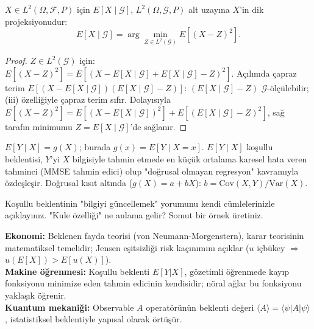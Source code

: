 \begin{onerme}
\label{prop:l2_projeksiyon}
$X \in L^2(\Omega, \mathcal{F}, P)$ için $E[X \mid \mathcal{G}]$,
$L^2(\Omega, \mathcal{G}, P)$ alt uzayına $X$'in dik projeksiyonudur:
\[
  E[X \mid \mathcal{G}] = \arg\min_{Z \in L^2(\mathcal{G})} E[(X - Z)^2].
\]
\end{onerme}

\begin{proof}
$Z \in L^2(\mathcal{G})$ için:
$E[(X-Z)^2] = E[(X - E[X\mid\mathcal{G}] + E[X\mid\mathcal{G}] - Z)^2]$.
Açılımda çapraz terim $E[(X - E[X\mid\mathcal{G}])(E[X\mid\mathcal{G}] - Z)]$:
$(E[X\mid\mathcal{G}] - Z)$ $\mathcal{G}$-ölçülebilir; (iii) özelliğiyle çapraz terim sıfır.
Dolayısıyla $E[(X-Z)^2] = E[(X-E[X\mid\mathcal{G}])^2] + E[(E[X\mid\mathcal{G}]-Z)^2]$,
sağ tarafın minimumu $Z = E[X \mid \mathcal{G}]$'de sağlanır.
\end{proof}

\begin{ornek}[Regresyon]
$E[Y \mid X] = g(X)$; burada $g(x) = E[Y \mid X = x]$.
$E[Y \mid X]$ koşullu beklentisi, $Y$'yi $X$ bilgisiyle tahmin etmede
en küçük ortalama karesel hata veren tahminci (MMSE tahmin edici) olup
"doğrusal olmayan regresyon" kavramıyla özdeşleşir.
Doğrusal kısıt altında ($g(X) = a + bX$): $b = \mathrm{Cov}(X,Y)/\mathrm{Var}(X)$.
\end{ornek}

\begin{kendinleifade}
Koşullu beklentinin "bilgiyi güncellemek" yorumunu kendi cümlelerinizle açıklayınız.
"Kule özelliği" ne anlama gelir? Somut bir örnek üretiniz.
\end{kendinleifade}

\begin{kopru}
\textbf{Ekonomi:} Beklenen fayda teorisi (von Neumann-Morgenstern), karar teorisinin
matematiksel temelidir; Jensen eşitsizliği risk kaçınımını açıklar ($u$ içbükey $\Rightarrow$ $u(E[X]) > E[u(X)]$).\\
\textbf{Makine öğrenmesi:} Koşullu beklenti $E[Y|X]$, gözetimli öğrenmede kayıp fonksiyonu
minimize eden tahmin edicinin kendisidir; nöral ağlar bu fonksiyonu yaklaşık öğrenir.\\
\textbf{Kuantum mekaniği:} Observable $A$ operatörünün beklenti değeri $\langle A \rangle = \langle \psi | A | \psi \rangle$,
istatistiksel beklentiyle yapısal olarak örtüşür.
\end{kopru}


